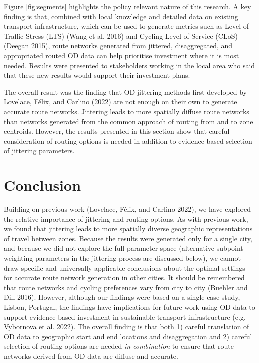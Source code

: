 \documentclass{isprs} %
\begin{document}
Figure \ref{fig:segments} highlights the policy relevant nature of this research.
A key finding is that, combined with local knowledge and detailed data on existing transport infrastructure, which can be used to generate metrics such as Level of Traffic Stress (LTS) (Wang et al. 2016) and Cycling Level of Service (CLoS) (Deegan 2015), route networks generated from jittered, disaggregated, and appropriated routed OD data can help prioritise investment where it is most needed.
Results were presented to stakeholders working in the local area who said that these new results would support their investment plans.

The overall result was the finding that OD jittering methods first developed by Lovelace, Félix, and Carlino (2022) are not enough on their own to generate accurate route networks.
Jittering leads to more spatially diffuse route networks than networks generated from the common approach of routing from and to zone centroids.
However, the results presented in this section show that careful consideration of routing options is needed in addition to evidence-based selection of jittering parameters.

\hypertarget{conclusion}{%
\section{Conclusion}\label{conclusion}}

Building on previous work (Lovelace, Félix, and Carlino 2022), we have explored the relative importance of jittering and routing options.
As with previous work, we found that jittering leads to more spatially diverse geographic representations of travel between zones.
Because the results were generated only for a single city, and because we did not explore the full parameter space (alternative subpoint weighting parameters in the jittering process are discussed below), we cannot draw specific and universally applicable conclusions about the optimal settings for accurate route network generation in other cities.
It should be remembered that route networks and cycling preferences vary from city to city (Buehler and Dill 2016).
However, although our findings were based on a single case study, Lisbon, Portugal, the findings have implications for future work using OD data to support evidence-based investment in sustainable transport infrastructure (e.g. Vybornova et al. 2022).
The overall finding is that both 1) careful translation of OD data to geographic start and end locations and disaggregation and 2) careful selection of routing options are needed \emph{in combination} to ensure that route networks derived from OD data are diffuse and accurate.
\end{document}
